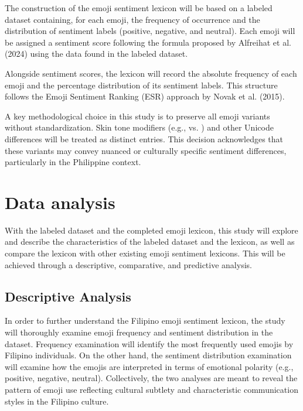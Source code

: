 The construction of the emoji sentiment lexicon will be based on a labeled dataset containing, for each emoji, the frequency of occurrence and the distribution of sentiment labels (positive, negative, and neutral). Each emoji will be assigned a sentiment score following the formula proposed by Alfreihat et al. (2024) using the data found in the labeled dataset.

Alongside sentiment scores, the lexicon will record the absolute frequency of each emoji and the percentage distribution of its sentiment labels. This structure follows the Emoji Sentiment Ranking (ESR) approach by Novak et al. (2015).

A key methodological choice in this study is to preserve all emoji variants without standardization. Skin tone modifiers (e.g.,  vs. ) and other Unicode differences will be treated as distinct entries. This decision acknowledges that these variants may convey nuanced or culturally specific sentiment differences, particularly in the Philippine context.

\section{Data analysis}

With the labeled dataset and the completed emoji lexicon, this study will explore and describe the characteristics of the labeled dataset and the lexicon, as well as compare the lexicon with other existing emoji sentiment lexicons. This will be achieved through a descriptive, comparative, and predictive analysis.

\subsection{Descriptive Analysis}

In order to further understand the Filipino emoji sentiment lexicon, the study will thoroughly examine emoji frequency and sentiment distribution in the dataset. Frequency examination will identify the most frequently used emojis by Filipino individuals. On the other hand, the sentiment distribution examination will examine how the emojis are interpreted in terms of emotional polarity (e.g., positive, negative, neutral). Collectively, the two analyses are meant to reveal the pattern of emoji use reflecting cultural subtlety and characteristic communication styles in the Filipino culture.

